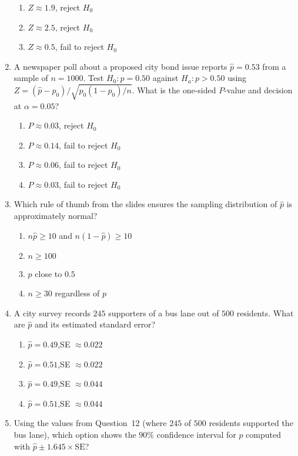 \documentclass{article}
\begin{document}
\begin{enumerate}
\begin{enumerate}[label=(\Alph*)]
  \item $Z\approx1.9$, reject $H_0$
  \item $Z\approx2.5$, reject $H_0$
  \item $Z\approx0.5$, fail to reject $H_0$
  \end{enumerate}
\item A newspaper poll about a proposed city bond issue reports $\hat{p}=0.53$ from a sample of $n=1000$. Test $H_0:p=0.50$ against $H_a:p>0.50$ using $Z=(\hat{p}-p_0)/\sqrt{p_0(1-p_0)/n}$. What is the one-sided $P$-value and decision at $\alpha=0.05$?
  \begin{enumerate}[label=(\Alph*)]
  \item $P\approx0.03$, reject $H_0$
  \item $P\approx0.14$, fail to reject $H_0$
  \item $P\approx0.06$, fail to reject $H_0$
  \item $P\approx0.03$, fail to reject $H_0$
  \end{enumerate}
\item Which rule of thumb from the slides ensures the sampling distribution of $\hat{p}$ is approximately normal?
  \begin{enumerate}[label=(\Alph*)]
  \item $n\hat{p}\ge10$ and $n(1-\hat{p})\ge10$
  \item $n\ge100$
  \item $p$ close to $0.5$
  \item $n\ge30$ regardless of $p$
  \end{enumerate}
\item A city survey records $245$ supporters of a bus lane out of $500$ residents. What are $\hat{p}$ and its estimated standard error?
  \begin{enumerate}[label=(\Alph*)]
  \item $\hat{p}=0.49$,\quad SE $\approx0.022$
  \item $\hat{p}=0.51$,\quad SE $\approx0.022$
  \item $\hat{p}=0.49$,\quad SE $\approx0.044$
  \item $\hat{p}=0.51$,\quad SE $\approx0.044$
  \end{enumerate}
\item Using the values from Question~12 (where $245$ of $500$ residents supported the bus lane), which option shows the $90\%$ confidence interval for $p$ computed with $\hat{p}\pm1.645\times\text{SE}$?
  \begin{enumerate}[label=(\Alph*)]

\end{enumerate}
\end{enumerate}
\end{document}
